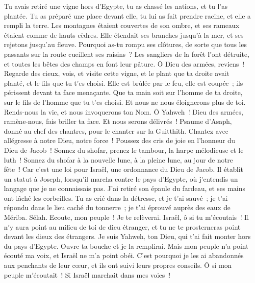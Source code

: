 \begin{multicols}{2}
Tu avais retiré une vigne hors d'Egypte, tu as chassé les nations, et tu l'as plantée.
Tu as préparé une place devant elle, tu lui as fait prendre racine, et elle a rempli la terre.
Les montagnes étaient couvertes de son ombre, et ses rameaux étaient comme de hauts cèdres.
Elle étendait ses branches jusqu'à la mer, et ses rejetons jusqu'au fleuve.
Pourquoi as-tu rompu ses clôtures, de sorte que tous les passants sur la route cueillent ses raisins~?
Les sangliers de la forêt l'ont détruite, et toutes les bêtes des champs en font leur pâture.
Ô Dieu des armées, reviens~! Regarde des cieux, vois, et visite cette vigne,
et le plant que ta droite avait planté, et le fils que tu t'es choisi.
Elle est brûlée par le feu, elle est coupée~; ils périssent devant ta face menaçante.
Que ta main soit sur l'homme de ta droite, sur le fils de l'homme que tu t'es choisi.
Et nous ne nous éloignerons plus de toi. Rends-nous la vie, et nous invoquerons ton Nom.
Ô Yahweh~! Dieu des armées, ramène-nous, fais briller ta face. Et nous serons délivrés~!
\VerseOne{}Psaume d'Asaph, donné au chef des chantres, pour le chanter sur la Guitthith.
Chantez avec allégresse à notre Dieu, notre force~! Poussez des cris de joie en l'honneur du Dieu de Jacob~!
Sonnez du shofar, prenez le tambour, la harpe mélodieuse et le luth~!
Sonnez du shofar à la nouvelle lune, à la pleine lune, au jour de notre fête~!
Car c'est une loi pour Israël, une ordonnance du Dieu de Jacob.
Il établit un statut à Joseph, lorsqu'il marcha contre le pays d'Egypte, où j'entendis un langage que je ne connaissais pas.
J'ai retiré son épaule du fardeau, et ses mains ont lâché les corbeilles.
Tu as crié dans la détresse, et je t'ai sauvé~; je t'ai répondu dans le lieu caché du tonnerre~; je t'ai éprouvé auprès des eaux de Mériba. Sélah.
Ecoute, mon peuple~! Je te relèverai. Israël, ô si tu m'écoutais~!
 Il n'y aura point au milieu de toi de dieu étranger, et tu ne te prosterneras point devant les dieux des étrangers.
Je suis Yahweh, ton Dieu, qui t'ai fait monter hors du pays d'Egypte. Ouvre ta bouche et je la remplirai.
Mais mon peuple n'a point écouté ma voix, et Israël ne m'a point obéi.
C'est pourquoi je les ai abandonnés aux penchants de leur cœur, et ils ont suivi leurs propres conseils.
Ô si mon peuple m'écoutait~! Si Israël marchait dans mes voies~!

\end{multicols}
